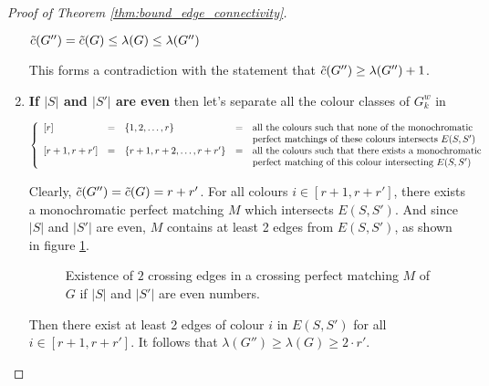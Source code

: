 \begin{proof}[Proof of Theorem \ref{thm:bound_edge_connectivity}]
\begin{enumerate}
            \begin{center}
                $\Tilde{c}(G'') = \Tilde{c}(G) \leq \lambda(G) \leq \lambda(G'')$
            \end{center}
            
            This forms a contradiction with the statement that $\Tilde{c}(G'') \geq \lambda(G'') + 1$.
            
        \item
            \textbf{If $|S|$ and $|S'|$ are even} then let's separate all the colour classes of $G_k^w$ in
            
            \begin{center}
                $\left\{ \begin{array}{l c l c l}
                    [r]             & = & \{1, 2, \dots, r\}              & = & \mbox{all the colours such that none of the monochromatic} \\
                                    &   &                                 &   & \mbox{perfect matchings of these colours intersects } E(S, S') \\ 
                    {[r + 1, r + r']} & = & \{r + 1, r + 2, \dots, r + r'\} & = & \mbox{all the colours such that there exists a monochromatic} \\
                                    &   &                                 &   & \mbox{perfect matching of this colour intersecting } E(S, S')
                \end{array} \right.$
            \end{center}
            
            Clearly, $\Tilde{c}(G'') = \Tilde{c}(G) = r + r'$. For all colours $i \in [r + 1, r + r']$, there exists a monochromatic perfect matching $M$ which intersects $E(S, S')$. And since $|S|$ and $|S'|$ are even, $M$ contains at least 2 edges from $E(S, S')$, as shown in figure \ref{fig:proof_lambda_even}.
            
            \begin{figure}[H]
                \caption{Existence of $2$ crossing edges in a crossing perfect matching $M$ of $G$ if $|S|$ and $|S'|$ are even numbers.}
                \label{fig:proof_lambda_even}
            \end{figure}
            
            Then there exist at least 2 edges of colour $i$ in $E(S, S')$ for all $i \in [r + 1, r + r']$. It follows that $\lambda(G'') \geq \lambda(G) \geq 2 \cdot r'$.
            

\end{enumerate}
\end{proof}
